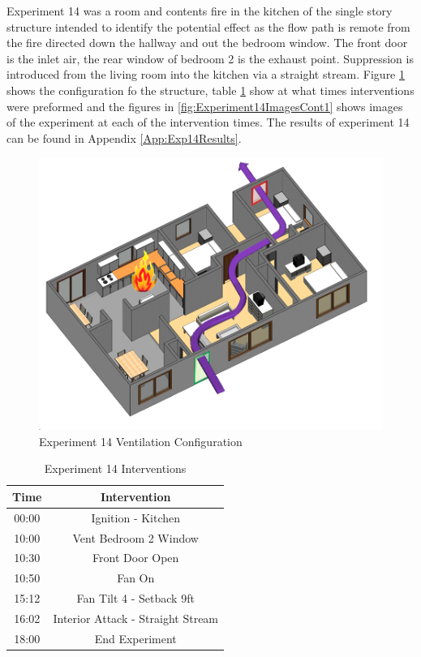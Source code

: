 \documentclass{article}
\begin{document}
Experiment 14 was a room and contents fire in the kitchen of the single story structure intended to identify the potential effect as the flow path is remote from the fire directed down the hallway and out the bedroom window. The front door is the inlet air, the rear window of bedroom 2 is the exhaust point. Suppression is introduced from the living room into the kitchen via a straight stream. Figure \ref{fig:Exp14VentConfig} shows the configuration fo the structure, table \ref{Table:Exp14Interventions} show at what times interventions were preformed and the figures in \ref{fig:Experiment14ImagesCont1} shows images of the experiment at each of the intervention times. The results of experiment 14 can be found in Appendix \ref{App:Exp14Results}.

\begin{figure}[h!]
	\centering
	\includegraphics[width=5in]{0_Images/FireExperiments/Single_Story/Experiment_14.jpg}
	\caption{Experiment 14 Ventilation Configuration}
	\label{fig:Exp14VentConfig}
\end{figure}

\begin{table}[H]
	\centering
	\caption{Experiment 14 Interventions}
	\begin{tabular}{|c|c|} 
		\hline
		Time & Intervention \\ \hline \hline
		00:00 & Ignition - Kitchen \\ \hline
		10:00 & Vent Bedroom 2 Window \\ \hline
		10:30 & Front Door Open \\ \hline
		10:50 & Fan On \\ \hline
		15:12 & Fan Tilt 4 - Setback 9ft \\ \hline
		16:02 & Interior Attack - Straight Stream \\ \hline
		18:00 & End Experiment \\ \hline
	\end{tabular}
	\label{Table:Exp14Interventions}
\end{table}
\end{document}
